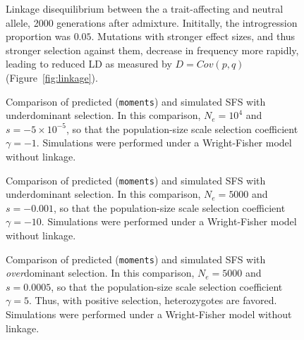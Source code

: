 \documentclass[10pt,letterpaper]{article}
\newcommand{\moments}{\texttt{moments}\xspace}
\begin{document}
\begin{figure}[ht!]
    \centering
    \caption{
        Linkage disequilibrium between the a trait-affecting and neutral allele,
        2000 generations after admixture. Inititally, the introgression proportion
        was $0.05$. Mutations with stronger effect sizes, and thus stronger selection
        against them, decrease in frequency more rapidly, leading to reduced LD
        as measured by $D=Cov(p,q)$ (Figure~\ref{fig:linkage}).
    }
    \label{fig:supp-LD}
\end{figure}

\begin{figure}[ht!]
    \centering
    \caption{
        Comparison of predicted (\moments) and simulated SFS with underdominant
        selection. In this comparison, $N_e=10^4$ and $s=-5\times10^{-5}$, so that
        the population-size scale selection coefficient $\gamma=-1$.
        Simulations were performed under a Wright-Fisher model without linkage.
    }
    \label{fig:underdominance-validation-small-s}
\end{figure}

\begin{figure}[ht!]
    \centering
    \caption{
        Comparison of predicted (\moments) and simulated SFS with underdominant
        selection. In this comparison, $N_e=5000$ and $s=-0.001$, so that
        the population-size scale selection coefficient $\gamma=-10$.
        Simulations were performed under a Wright-Fisher model without linkage.
    }
    \label{fig:underdominance-validation-large-s}
\end{figure}

\begin{figure}[ht!]
    \centering
    \caption{
        Comparison of predicted (\moments) and simulated SFS with \emph{over}dominant
        selection. In this comparison, $N_e=5000$ and $s=0.0005$, so that
        the population-size scale selection coefficient $\gamma=5$.
        Thus, with positive selection, heterozygotes are favored.
        Simulations were performed under a Wright-Fisher model without linkage.
    }
    \label{fig:overdominance-validation}
\end{figure}
\end{document}
